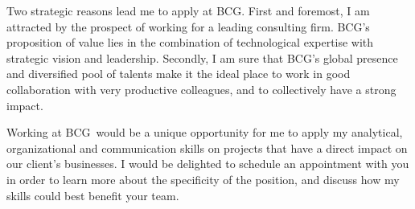 \documentclass[11pt, a4paper]{awesome-cv}
\newcommand{\company}{BCG}
\begin{document}
\begin{cvletter}
Two strategic reasons lead me to apply at \company.    
First and foremost, I am attracted by the prospect of working for a leading consulting firm. 
\company's proposition of value lies in the combination of technological expertise with strategic vision and leadership. 
Secondly, I am sure that \company's global presence and diversified pool of talents make it the ideal place to work in good collaboration with very productive colleagues, and to collectively have a strong impact.  

Working at \company~would be a unique opportunity for me to apply my analytical, organizational and communication skills on projects that have a direct impact on our client's businesses. 
I would be delighted to schedule an appointment with you in order to learn more about the specificity of the position, and discuss how my skills could best benefit your team. 
\end{cvletter}


\makeletterclosing
\end{document}
